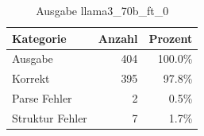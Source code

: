 
\begin{table}[!ht]
\centering
\begin{tabular}{lrr}
\toprule
\textbf{Kategorie} & \textbf{Anzahl} & \textbf{Prozent} \\
\midrule
Ausgabe & 404 & 100.0\% \\
Korrekt & 395 & 97.8\% \\
Parse Fehler & 2 & 0.5\% \\
Struktur Fehler & 7 & 1.7\% \\
\bottomrule
\end{tabular}
\caption{Ausgabe llama3_70b_ft_0}
\label{tab:file_counts}
\end{table}
    